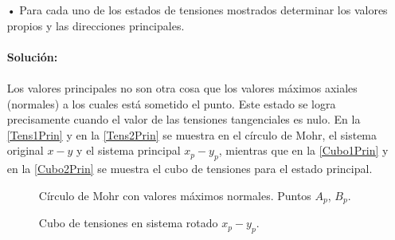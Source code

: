 \documentclass[../notas medios.tex]{subfiles}
\begin{document}
\begin{enumerate}
%

\item[•] Para cada uno de los estados de tensiones mostrados determinar los valores
propios y las direcciones principales. \\\\
%
\textbf{Solución:}\\\\
%
Los valores principales no son otra cosa que los valores máximos axiales
(normales) a los cuales está sometido el punto. Este estado se logra
precisamente cuando el valor de las tensiones tangenciales es nulo. En la
 \cref{Tens1Prin} y en la  \cref{Tens2Prin} se muestra en el círculo de Mohr, el
sistema original $x-y$ y el sistema principal $x_p - y_p$, mientras que en la \cref{Cubo1Prin} y en la  \cref{Cubo2Prin} se muestra el cubo de tensiones para
el estado principal.


\begin{figure}[H]
	\centering
		\hspace{0.5cm}
	\caption{Círculo de Mohr con valores máximos normales. Puntos $A_p$, $B_p$. }
	\label{TensPrin}
\end{figure}

\begin{figure}[H]
	\centering
		\hspace{0.5cm}
	\caption{Cubo de tensiones en sistema rotado $x_p-y_p$. }
	\label{CubosPrincipal}
\end{figure}


\end{enumerate}
\end{document}
